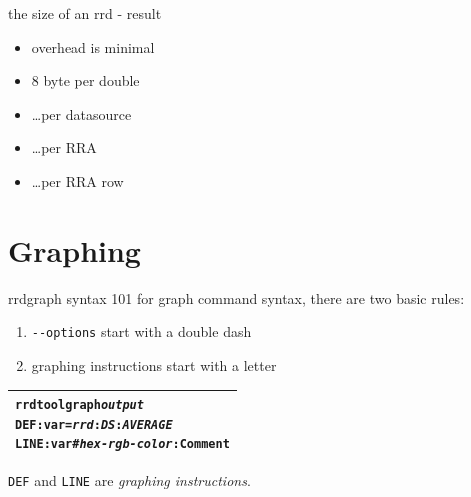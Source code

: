 
\begin{frame}{the size of an rrd - result}

\begin{itemize}[<+-| alert@+>]
\item overhead is minimal
\item 8 byte per double 
\item \ldots per datasource
\item \ldots per RRA
\item \ldots per RRA row
\end{itemize}
\end{frame}



\section{Graphing}
\begin{frame}[fragile]{rrdgraph syntax 101}
for graph command syntax, there are two basic rules:\pause
\begin{enumerate}
\item \texttt{-{}-options} start with a double dash\pause
\item graphing instructions start with a letter
\end{enumerate}

\pause
\begin{center}
\renewcommand{\tabcolsep}{0.4cm}
\renewcommand{\arraystretch}{2}

\begin{tabular}{|l|}\hline
\begin{minipage}[t]{0.7\textwidth}
\begin{alltt}
rrdtool graph \textit{output}
   DEF:var=\textit{rrd}:\textit{DS}:\textit{AVERAGE}
   LINE:var#\textit{hex-rgb-color}:Comment

\end{alltt}
\end{minipage}\\\hline
\end{tabular}
\end{center}

\texttt{DEF} and \texttt{LINE} are \emph{graphing instructions}.
\end{frame}


